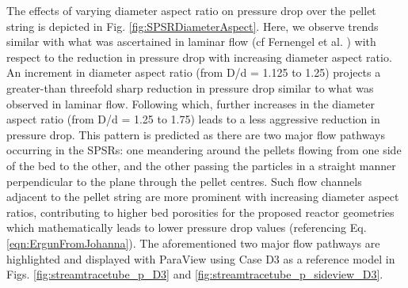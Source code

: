 The effects of varying diameter aspect ratio on pressure drop over the pellet string is depicted in Fig. \ref{fig:SPSRDiameterAspect}. Here, we observe trends similar with what was ascertained in laminar flow (cf Fernengel et al. \cite{Fernengel2020}) with respect to the reduction in pressure drop with increasing diameter aspect ratio. An increment in diameter aspect ratio (from D/d = 1.125 to 1.25) projects a greater-than threefold sharp reduction in pressure drop similar to what was observed in laminar flow. Following which, further increases in the diameter aspect ratio (from D/d = 1.25 to 1.75) leads to a less aggressive reduction in pressure drop. This pattern is predicted as there are two major flow pathways occurring in the SPSRs: one meandering around the pellets flowing from one side of the bed to the other, and the other passing the particles in a straight manner perpendicular to the plane through the pellet centres. Such flow channels adjacent to the pellet string are more prominent with increasing diameter aspect ratios, contributing to higher bed porosities for the proposed reactor geometries \cite{Fernengel2020} which mathematically leads to lower pressure drop values (referencing Eq. \ref{eqn:ErgunFromJohanna}). The aforementioned two major flow pathways are highlighted and displayed with ParaView using Case D3 as a reference model in Figs. \ref{fig:streamtracetube_p_D3} and \ref{fig:streamtracetube_p_sideview_D3}.
